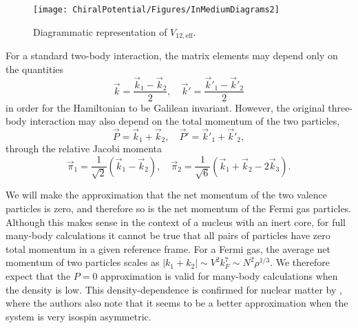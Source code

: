 \begin{figure}
\texttt{[image: ChiralPotential/Figures/InMediumDiagrams2]}
\caption{\label{fig:eff-diagram} Diagrammatic representation of $V_{12,\text{eff}}$.}
\end{figure}

For a standard two-body interaction, the matrix elements may depend only on the quantities
 \begin{equation}
 \vec{k}=\frac{\vec{k}_1-\vec{k}_2}{2},\quad \vec{k}'=\frac{\vec{k}'_1-\vec{k}'_2}{2}
 \end{equation}
 in order for the Hamiltonian to be Galilean invariant. However, the original three-body interaction may also depend on the total momentum of the two particles,
 \begin{equation}
 \vec{P}=\vec{k}_1+\vec{k}_2, \quad  \vec{P}'=\vec{k}'_1+\vec{k}'_2,
 \end{equation}
 through the relative Jacobi momenta 
 \begin{equation}
 \vec{\pi}_1=\frac{1}{\sqrt{2}}\left(\vec{k}_1-\vec{k}_2\right), \quad  \vec{\pi}_2=\frac{1}{\sqrt{6}}\left(\vec{k}_1+\vec{k}_2-2\vec{k}_3\right).
 \end{equation}
 
We will make the approximation that the net momentum of the two valence particles is zero, and therefore so is the net momentum of the Fermi gas particles. Although this makes sense in the context of a nucleus with an inert core, for full many-body calculations it cannot be true that all pairs of particles have zero total momentum in a given reference frame. For a Fermi gas, the average net momentum of two particles scales as 
$\overline{|k_1+k_2|} \sim V^2 k_F^7 
\sim N^2 \rho^{1/3}$. 
We therefore expect that the $P=0$ approximation is valid for many-body calculations when the density is low. This density-dependence is confirmed for nuclear matter by \cite{Drischler:2015eba}, where the authors also note that it seems to be a better approximation when the system is very isospin asymmetric. 
 
